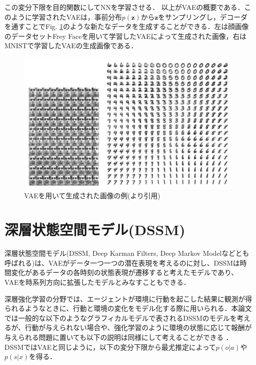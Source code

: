 この変分下限を目的関数にしてNNを学習させる．
以上がVAEの概要である．このように学習されたVAEは，事前分布$p(\bm{z})$から$\bm{z}$をサンプリングし，デコーダを通すことでFig. \ref{fig:vae_example}のような新たなデータを生成することができる．左は顔画像のデータセットFrey Faceを用いて学習したVAEによって生成された画像，右はMNISTで学習したVAEの生成画像である．


\begin{figure}[tbp]
  \begin{center}
    \includegraphics[width=\linewidth]{./figures/vae.png}
    \caption{VAEを用いて生成された画像の例(\cite{vae}より引用)}
    \label{fig:vae_example}
  \end{center}
\end{figure}

\section{深層状態空間モデル(DSSM)}
\label{section:dssm}

深層状態空間モデル(DSSM, Deep Karman Filters, Deep Markov Modelなどとも呼ばれる)は、VAEがデータ一つ一つの潜在表現を考えるのに対し、DSSMは時間変化があるデータの各時刻の状態表現が遷移すると考えたモデルであり、VAEを時系列方向に拡張したモデルとみなすこともできる．

深層強化学習の分野では、エージェントが環境に行動を起こした結果に観測が得られるようなときに、行動と環境の変化をモデル化する際に用いられる．本論文では一般的な以下のようなグラフィカルモデルで表されるDSSMのモデルを考えるが、行動が与えられない場合や、強化学習のように環境の状態に応じて報酬が与えられる問題に置いても以下の説明は同様にして考えることができる
．
DSSMではVAEと同じように，以下の変分下限から最尤推定によって$p(o|a)$や$p(s|x)$を得る．


